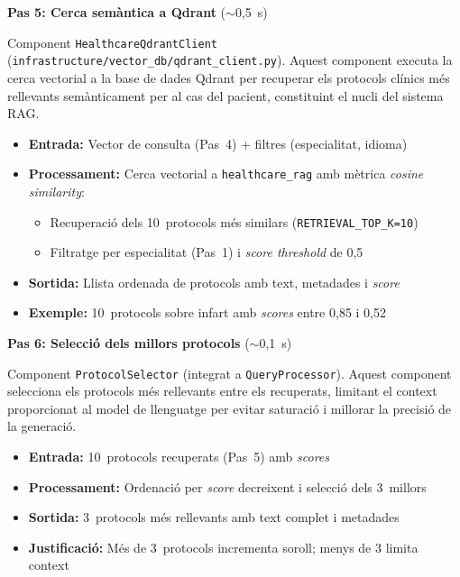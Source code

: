 \documentclass[CAT]{TFUOC}%
\begin{document}
\vspace{0.4em}

\textbf{Pas 5: Cerca semàntica a Qdrant} ($\sim$0,5~s)

Component \texttt{HealthcareQdrantClient} (\texttt{infrastructure/vector\_db/qdrant\_client.py}). Aquest component executa la cerca vectorial a la base de dades Qdrant per recuperar els protocols clínics més rellevants semànticament per al cas del pacient, constituint el nucli del sistema RAG.

\begin{itemize}
    \setlength{\itemsep}{0.3em}
    \item \textbf{Entrada:} Vector de consulta (Pas~4) + filtres (especialitat, idioma)
    \item \textbf{Processament:} Cerca vectorial a \texttt{healthcare\_rag} amb mètrica \textit{cosine similarity}:
    \begin{itemize}
        \item Recuperació dels 10~protocols més similars (\texttt{RETRIEVAL\_TOP\_K=10})
        \item Filtratge per especialitat (Pas~1) i \textit{score threshold} de 0,5
    \end{itemize}
    \item \textbf{Sortida:} Llista ordenada de protocols amb text, metadades i \textit{score}
    \item \textbf{Exemple:} 10~protocols sobre infart amb \textit{scores} entre 0,85 i 0,52
\end{itemize}

\vspace{0.4em}

\textbf{Pas 6: Selecció dels millors protocols} ($\sim$0,1~s)

Component \texttt{ProtocolSelector} (integrat a \texttt{QueryProcessor}). Aquest component selecciona els protocols més rellevants entre els recuperats, limitant el context proporcionat al model de llenguatge per evitar saturació i millorar la precisió de la generació.

\begin{itemize}
    \setlength{\itemsep}{0.3em}
    \item \textbf{Entrada:} 10~protocols recuperats (Pas~5) amb \textit{scores}
    \item \textbf{Processament:} Ordenació per \textit{score} decreixent i selecció dels 3~millors
    \item \textbf{Sortida:} 3~protocols més rellevants amb text complet i metadades
    \item \textbf{Justificació:} Més de 3~protocols incrementa soroll; menys de 3 limita context
\end{itemize}
\end{document}
